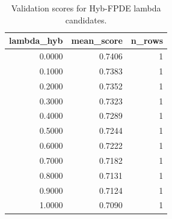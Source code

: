 \begin{table}[t]
\caption{Validation scores for Hyb-FPDE lambda candidates.}
\label{tab:lambda_distribution_computed}
\centering
\begin{tabular}{rrr}
\toprule
lambda\_hyb & mean\_score & n\_rows \\
\midrule
0.0000 & 0.7406 & 1 \\
0.1000 & 0.7383 & 1 \\
0.2000 & 0.7352 & 1 \\
0.3000 & 0.7323 & 1 \\
0.4000 & 0.7289 & 1 \\
0.5000 & 0.7244 & 1 \\
0.6000 & 0.7222 & 1 \\
0.7000 & 0.7182 & 1 \\
0.8000 & 0.7131 & 1 \\
0.9000 & 0.7124 & 1 \\
1.0000 & 0.7090 & 1 \\
\bottomrule
\end{tabular}

\end{table}
